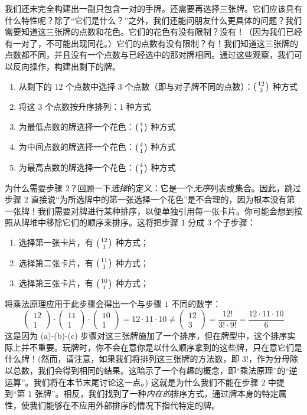 \begin{example}[一对]
    我们还未完全构建出一副只包含一对的手牌。还需要再选择三张牌。它们应该具有什么特性呢？除了``它们是什么？''之外，我们还能问朋友什么更具体的问题？我们需要知道这三张牌的点数和花色。它们的花色有没有限制？没有！（因为我们已经有一对了，不可能出现同花。）它们的点数有没有限制？有！我们知道这三张牌的点数都不同，并且没有一个点数与已经选中的那对牌相同。通过这些观察，我们可以反向操作，构建出剩下的牌。
    \begin{enumerate}
        \item 从剩下的 $12$ 个点数中选择 $3$ 个点数（即与对子牌不同的点数）：$\big({12 \atop 3}\big)$ 种方式
        \item 将这 $3$ 个点数按升序排列：$1$ 种方式
        \item 为最低点数的牌选择一个花色：$\big({4 \atop 1}\big)$ 种方式
        \item 为中间点数的牌选择一个花色：$\big({4 \atop 1}\big)$ 种方式
        \item 为最高点数的牌选择一个花色：$\big({4 \atop 1}\big)$ 种方式
    \end{enumerate}
    为什么需要步骤 $2$？回顾一下\emph{选择}的定义：它是一个\emph{无序}列表或集合。因此，跳过步骤 $2$ 直接说``为所选牌中的第一张选择一个花色''是不合理的，因为根本没有第一张牌！我们需要对牌进行某种排序，以便单独引用每一张卡片。你可能会想到按照从牌堆中移除它们的顺序来排序。这将把步骤 $1$ 分成 $3$ 个子步骤：
    \begin{enumerate}[label=(\alph*)]
        \item 选择第一张卡片，有 $\big({12 \atop 1}\big)$ 种方式；
        \item 选择第二张卡片，有 $\big({11 \atop 1}\big)$ 种方式；
        \item 选择第三张卡片，有 $\big({10 \atop 1}\big)$ 种方式；
    \end{enumerate}
    将乘法原理应用于此步骤会得出一个与步骤 $1$ 不同的数字：
    \[\begin{pmatrix}
            12 \\
            1
        \end{pmatrix} \cdot \begin{pmatrix}
            11 \\
            1
        \end{pmatrix} \cdot \begin{pmatrix}
            10 \\
            1
        \end{pmatrix} = 12 \cdot 11 \cdot 10 \ne \begin{pmatrix}
            12 \\
            3
        \end{pmatrix} = \frac{12!}{3! \cdot 9!} = \frac{12 \cdot 11 \cdot 10}{6}\]
    这是因为 (a)-(b)-(c) 步骤对这三张牌施加了一个排序，但在牌型中，这个排序实际上并不重要。玩牌时，你不会在意你是以什么顺序拿到的这些牌，只在意它们是什么牌！(然而，请注意，如果我们将排列这三张牌的方法数，即 $3!$，作为分母除以总数，我们会得到相同的结果。这暗示了一个有趣的概念，即``乘法原理''的``逆运算''。我们将在本节末尾讨论这一点。) 这就是为什么我们不能在步骤 $2$ 中提到``第 $1$ 张牌''。相反，我们找到了一种\emph{内在的}排序方式，通过牌本身的特定属性，使我们能够在不应用外部排序的情况下指代特定的牌。


\end{example}
